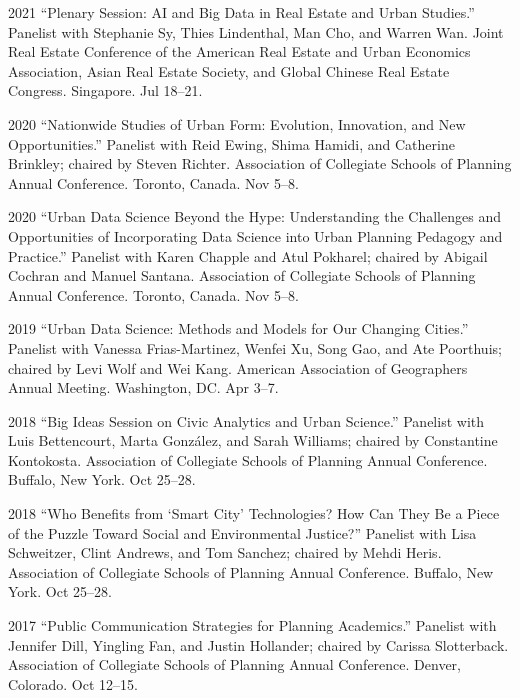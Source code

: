 \documentclass[12pt,letterpaper]{report}
\begin{document}
    \begin{tablist}

        \item[2021] \tab \enquote{Plenary Session: AI and Big Data in Real Estate and Urban Studies.} Panelist with Stephanie Sy, Thies Lindenthal, Man Cho, and Warren Wan. Joint Real Estate Conference of the American Real Estate and Urban Economics Association, Asian Real Estate Society, and Global Chinese Real Estate Congress. Singapore. Jul 18--21.

        \item[2020] \tab \enquote{Nationwide Studies of Urban Form: Evolution, Innovation, and New Opportunities.} Panelist with Reid Ewing, Shima Hamidi, and Catherine Brinkley; chaired by Steven Richter. Association of Collegiate Schools of Planning Annual Conference. Toronto, Canada. Nov 5--8.

        \item[2020] \tab \enquote{Urban Data Science Beyond the Hype: Understanding the Challenges and Opportunities of Incorporating Data Science into Urban Planning Pedagogy and Practice.} Panelist with Karen Chapple and Atul Pokharel; chaired by Abigail Cochran and Manuel Santana. Association of Collegiate Schools of Planning Annual Conference. Toronto, Canada. Nov 5--8.

        \item[2019] \tab \enquote{Urban Data Science: Methods and Models for Our Changing Cities.} Panelist with Vanessa Frias-Martinez, Wenfei Xu, Song Gao, and Ate Poorthuis; chaired by Levi Wolf and Wei Kang. American Association of Geographers Annual Meeting. Washington, DC. Apr 3--7.

        \item[2018] \tab \enquote{Big Ideas Session on Civic Analytics and Urban Science.} Panelist with Luis Bettencourt, Marta González, and Sarah Williams; chaired by Constantine Kontokosta. Association of Collegiate Schools of Planning Annual Conference. Buffalo, New York. Oct 25--28.

        \item[2018] \tab \enquote{Who Benefits from \enquote{Smart City} Technologies? How Can They Be a Piece of the Puzzle Toward Social and Environmental Justice?} Panelist with Lisa Schweitzer, Clint Andrews, and Tom Sanchez; chaired by Mehdi Heris. Association of Collegiate Schools of Planning Annual Conference. Buffalo, New York. Oct 25--28.

        \item[2017] \tab \enquote{Public Communication Strategies for Planning Academics.} Panelist with Jennifer Dill, Yingling Fan, and Justin Hollander; chaired by Carissa Slotterback. Association of Collegiate Schools of Planning Annual Conference. Denver, Colorado. Oct 12--15.

    \end{tablist}
\end{document}
